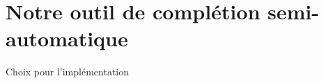 \section{Notre outil de complétion semi-automatique}

\begin{frame}{Choix pour l'implémentation}

\end{frame}
